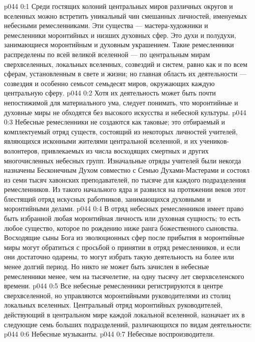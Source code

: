 \author{Архангел}
\vs p044 0:1 Среди гостящих колоний центральных миров различных округов и вселенных можно встретить уникальный чин смешанных личностей, именуемых небесными ремесленниками. Эти существа --- мастера\hyp{}художники и ремесленники моронтийных и низших духовных сфер. Это духи и полудухи, занимающиеся моронтийным и духовным украшением. Такие ремесленники распределены по всей великой вселенной --- по центральным мирам сверхвселенных, локальных вселенных, созвездий и систем, равно как и по всем сферам, установленным в свете и жизни; но главная область их деятельности --- созвездия и особенно семьсот семьдесят миров, окружающих каждую центральную сферу.
\vs p044 0:2 Хотя их деятельность может быть почти непостижимой для материального ума, следует понимать, что моронтийные и духовные миры не обходятся без высокого искусства и небесной культуры.
\vs p044 0:3 \pc Небесные ремесленники не создаются как таковые; это отбираемый и комплектуемый отряд существ, состоящий из некоторых личностей учителей, являющихся исконными жителями центральной вселенной, и их учеников\hyp{}волонтеров, привлекаемых из числа восходящих смертных и других многочисленных небесных групп. Изначальные отряды учителей были некогда назначены Бесконечным Духом совместно с Семью Духами\hyp{}Мастерами и состоял из семи тысяч хавонских преподавателей, по тысяче для каждого подразделения ремесленников. Из такого начального ядра и развился на протяжении веков этот блестящий отряд искусных работников, занимающихся духовными и моронтийными делами.
\vs p044 0:4 В отряд небесных ремесленников имеет право быть избранной любая моронтийная личность или духовная сущность; то есть любое существо, которое по рождению ниже ранга божественного сыновства. Восходящие сыны Бога из эволюционных сфер после прибытия в моронтийные миры могут обратиться с просьбой о принятии в отряд ремесленников, и если они достаточно одарены, то могут избрать такую деятельность на более или менее долгий период. Но никто не может быть зачислен в небесные ремесленники менее, чем на тысячелетие, на одну тысячу лет сверхвселенского времени.
\vs p044 0:5 Все небесные ремесленники регистрируются в центре сверхвселенной, но управляются моронтийными руководителями из столиц локальных вселенных. Центральный отряд моронтийных руководителей, действующий в центральном мире каждой локальной вселенной, назначает их в следующие семь больших подразделений, различающихся по видам деятельности:
\vs p044 0:6 \bibnobreakspace Небесные музыканты.
\vs p044 0:7 \bibnobreakspace Небесные воспроизводители.
